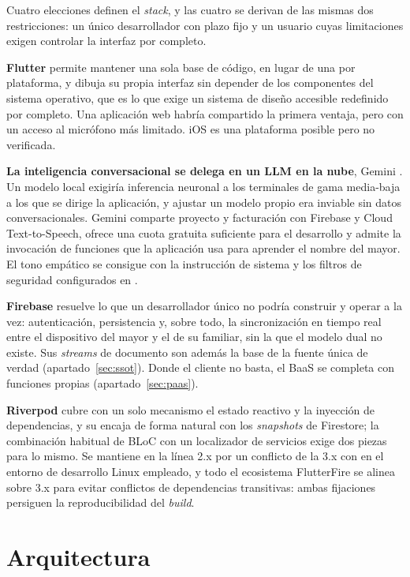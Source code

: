 Cuatro elecciones definen el \emph{stack}, y las cuatro se derivan de las mismas dos restricciones: un
único desarrollador con plazo fijo y un usuario cuyas limitaciones exigen controlar la interfaz por
completo.

\textbf{Flutter} permite mantener una sola base de código, en lugar de una por plataforma, y dibuja su
propia interfaz sin depender de los componentes del sistema operativo, que es lo que exige un sistema de
diseño accesible redefinido por completo. Una aplicación web habría compartido la primera ventaja, pero con
un acceso al micrófono más limitado. iOS es una plataforma posible pero no verificada.

\textbf{La inteligencia conversacional se delega en un LLM en la nube}, Gemini . Un
modelo local exigiría inferencia neuronal a los terminales de gama media-baja a los que se dirige la
aplicación, y ajustar un modelo propio era inviable sin datos conversacionales. Gemini comparte proyecto y
facturación con Firebase y Cloud Text-to-Speech, ofrece una cuota gratuita suficiente para el desarrollo y
admite la invocación de funciones que la aplicación usa para aprender el nombre del mayor. El tono empático
se consigue con la instrucción de sistema y los filtros de seguridad configurados en .

\textbf{Firebase} resuelve lo que un desarrollador único no podría construir y operar a la vez:
autenticación, persistencia y, sobre todo, la sincronización en tiempo real entre el dispositivo del mayor y
el de su familiar, sin la que el modelo dual no existe. Sus \emph{streams} de documento son además la base de
la fuente única de verdad (apartado~\ref{sec:ssot}). Donde el cliente no basta, el BaaS se completa con
funciones propias (apartado~\ref{sec:paas}).

\textbf{Riverpod} cubre con un solo mecanismo el estado reactivo y la inyección de dependencias, y su
 encaja de forma natural con los \emph{snapshots} de Firestore; la combinación habitual
de BLoC con un localizador de servicios exige dos piezas para lo mismo. Se mantiene en la línea 2.x por un
conflicto de la 3.x con  en el entorno de desarrollo Linux empleado, y todo el
ecosistema FlutterFire se alinea sobre  3.x para evitar conflictos de dependencias
transitivas: ambas fijaciones persiguen la reproducibilidad del \emph{build}.

\section{Arquitectura}
\label{sec:arquitectura}

